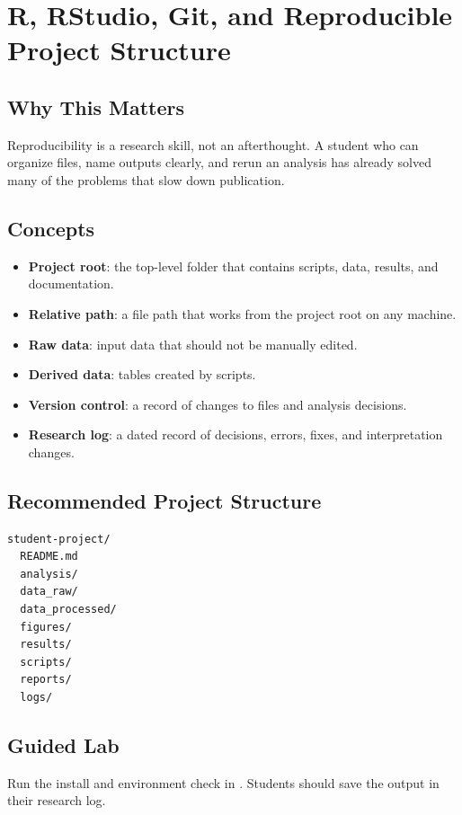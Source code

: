 \chapter{R, RStudio, Git, and Reproducible Project Structure}


\section{Why This Matters}
Reproducibility is a research skill, not an afterthought. A student who can organize files, name outputs clearly, and rerun an analysis has already solved many of the problems that slow down publication.

\section{Concepts}
\begin{itemize}
  \item \textbf{Project root}: the top-level folder that contains scripts, data, results, and documentation.
  \item \textbf{Relative path}: a file path that works from the project root on any machine.
  \item \textbf{Raw data}: input data that should not be manually edited.
  \item \textbf{Derived data}: tables created by scripts.
  \item \textbf{Version control}: a record of changes to files and analysis decisions.
  \item \textbf{Research log}: a dated record of decisions, errors, fixes, and interpretation changes.
\end{itemize}

\section{Recommended Project Structure}
\begin{verbatim}
student-project/
  README.md
  analysis/
  data_raw/
  data_processed/
  figures/
  results/
  scripts/
  reports/
  logs/
\end{verbatim}

\section{Guided Lab}
Run the install and environment check in . Students should save the output in their research log.

